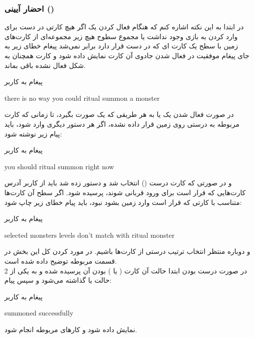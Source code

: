 \documentclass[]{article}
\begin{document}
\subsubsection*{{\titr احضار آیینی ()}}
در ابتدا به این نکته اشاره کنم که هنگام فعال کردن یک  اگر 
هیچ  کارتی در دست برای وارد کردن به بازی وجود نداشت یا مجموع 
سطوح 
هیچ زیر مجموعه‌ای از کارت‌های زمین با سطح یک کارت  ای که 
در 
دست قرار دارد برابر نمی‌شد پیغام خطای زیر به جای پیغام موفقیت در فعال شدن 
جادوی آن کارت نمایش داده شود و کارت همچنان به شکل فعال نشده باقی بماند.
\begin{mybox}[colback=yellow]{پیغام به کاربر}
	\begin{latin}	
		there is no way you could ritual summon a monster
	\end{latin}
\end{mybox}
در صورت فعال شدن یک  یا به هر طریقی که یک  
صورت بگیرد، تا زمانی که کارت مربوطه به درستی روی زمین قرار داده نشده، اگر 
هر دستور دیگری وارد شود، باید پیام زیر نوشته شود:
\begin{mybox}[colback=yellow]{پیغام به کاربر}
	\begin{latin}	
	    you should ritual summon right now	
	\end{latin}
\end{mybox}
و در صورتی که کارت درست () انتخاب شد و دستور  
زده شد باید از کاربر آدرس کارت‌هایی که قرار است برای ورود  قربانی 
شوند، پرسیده شود. اگر سطح آن‌ کارت‌ها متناسب با کارتی که قرار است وارد زمین 
بشود نبود، باید پیام خطای زیر چاپ شود:
\begin{mybox}[colback=yellow]{پیغام به کاربر}
	\begin{latin}	
		selected monsters levels don’t match with ritual monster
	\end{latin}
\end{mybox}
و دوباره منتظر انتخاب ترتیب درستی از کارت‌ها باشیم. در مورد  کردن 
کل این بخش در قسمت مربوطه توضیح داده شده است.
\\
در صورت درست بودن  ابتدا حالت آن کارت ( یا 
) بودن آن پرسیده شده و به یکی از 2 حالت  یا  
گذاشته می‌شود و سپس پیام:
\begin{mybox}[colback=yellow]{پیغام به کاربر}
	\begin{latin}	
	    summoned successfully	
	\end{latin}
\end{mybox}
    نمایش داده شود و کارهای مربوطه انجام شود.
\end{document}
